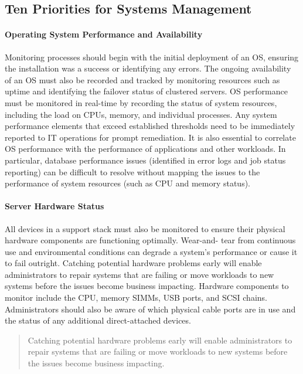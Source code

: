 \documentclass[8pt]{extarticle}
\begin{document}
\begin{multicols}{3}
\subsection{Ten Priorities for Systems Management}
\paragraph{Operating System Performance and Availability}
Monitoring processes should begin with the initial deployment
of an OS, ensuring the installation was a success or identifying any errors. The ongoing availability
of an OS must also be recorded and tracked by monitoring resources such as uptime and identifying
the failover status of clustered servers. OS performance must be monitored in real-time by recording
the status of system resources, including the load on CPUs, memory, and individual processes. Any
system performance elements that exceed established thresholds need to be immediately reported
to IT operations for prompt remediation. It is also essential to correlate OS performance with the
performance of applications and other workloads. In particular, database performance issues (identified
in error logs and job status reporting) can be difficult to resolve without mapping the issues to the
performance of system resources (such as CPU and memory status).

\paragraph{Server Hardware Status} All devices in a support stack must also be monitored to ensure their
physical hardware components are functioning optimally. Wear-and-
tear from continuous use and environmental conditions can degrade
a system’s performance or cause it to fail outright. Catching potential
hardware problems early will enable administrators to repair systems that
are failing or move workloads to new systems before the issues become
business impacting. Hardware components to monitor include the CPU,
memory SIMMs, USB ports, and SCSI chains. Administrators should
also be aware of which physical cable ports are in use and the status of
any additional direct-attached devices.

\begin{quote}
Catching potential hardware problems early will enable administrators to repair systems that are failing or 
move workloads to new systems before the issues become business impacting.
\end{quote}



\end{multicols}
\end{document}
